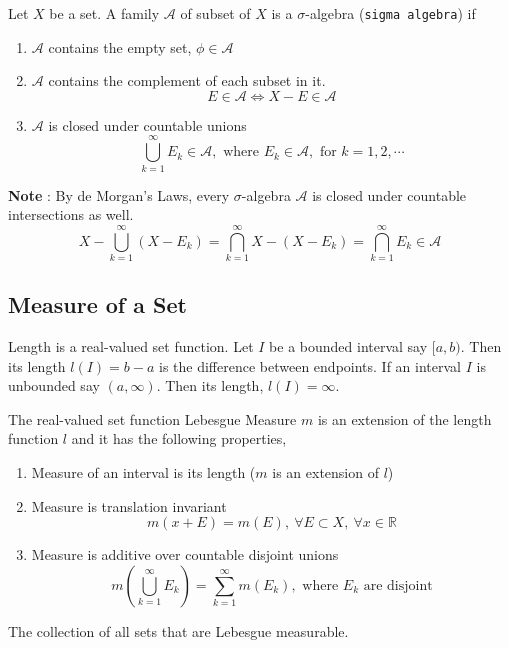\begin{definition}
	Let $X$ be a set. A family $\mathcal{A}$ of subset of $X$ is a $\sigma$-algebra (\texttt{sigma algebra}) if
	\begin{enumerate}
		\item $\mathcal{A}$ contains the empty set, $\phi \in \mathcal{A}$
		\item $\mathcal{A}$ contains the complement of each subset in it.
			$$E \in \mathcal{A} \iff X-E \in \mathcal{A}$$
		\item $\mathcal{A}$ is closed under countable unions
			$$\bigcup_{k = 1}^\infty E_k \in \mathcal{A},\text{ where } E_k \in \mathcal{A},\text{ for } k=1,2,\cdots$$
	\end{enumerate}
\end{definition}
\textbf{Note} : By de Morgan's Laws, every $\sigma$-algebra $\mathcal{A}$ is closed under countable intersections as well.
$$X-\bigcup_{k = 1}^\infty (X-E_k) = \bigcap_{k=1}^\infty X-(X-E_k) = \bigcap_{k=1}^\infty E_k \in \mathcal{A}$$

\subsection{Measure of a Set}
\begin{definition}
	Length is a real-valued set function. Let $I$ be a bounded interval say $[a,b)$. Then its length $l(I)=b-a$ is the difference between endpoints.
	If an interval $I$ is unbounded say $(a,\infty)$. Then its length, $l(I) = \infty$.
\end{definition}
\begin{definition}
	The real-valued set function Lebesgue Measure $m$ is an extension of the length function $l$ and it has the following properties,
	\begin{enumerate}
		\item Measure of an interval is its length ($m$ is an extension of $l$)
		\item Measure is translation invariant 
	$$m(x+E) = m(E),\ \forall E \subset X,\ \forall x \in \mathbb{R}$$
		\item Measure is additive over countable disjoint unions 
	 $$m\left( \bigcup_{k=1}^\infty E_k \right) = \sum_{k=1}^\infty m(E_k), \text{ where } E_k \text{ are disjoint}$$
	\end{enumerate}
\end{definition}

\begin{definition}
	The collection of all sets that are Lebesgue measurable.
\end{definition}

